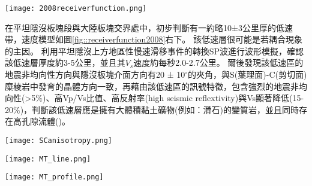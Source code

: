 \begin{figure*}[ht!]
    \centering
    \texttt{[image: 2008receiverfunction.png]}
    \caption{墨西哥平坦隱沒區域接收函數結果，摘自\citealp{PerezCampos2008}。上圖：黑色三角形表示測站沿剖面的位置，高程被放大10倍。粗棕色線表示跨墨西哥火山帶(TMVB, Trans-Mexican Volcanic Belt)的範圍。上圖接收函數影像中標出沿剖面50公里範圍內的震源(粉紅色點來自SSN地震目錄；綠色點來自\citealp{pardo1995}重新定位結果)位置。下方左圖：顯示沿平坦隱沒板塊的一次遠震事件的接收函數。下方中間圖:說明了相應的模型（LVM(low velocity mantle) = 低速地函和 OC(oceanic crust) = 海洋地殼）。下方右圖：根據左下圖接收函數模型中A、B和C位置上的P波速度模型。
    }
    \label{fig::receiverfunction2008}
\end{figure*}

\citealp{PerezCampos2008}在平坦隱沒板塊段與大陸板塊交界處中，初步判斷有一約略10±3公里厚的低速帶，速度模型如圖\ref{fig::receiverfunction2008}右下。
該低速層很可能是若耦合現象的主因。
\citealp{Song2009}利用平坦隱沒上方地區性慢速滑移事件的轉換SP波進行波形模擬，確認該低速層厚度約3-5公里，並且其$V_s$速度約每秒2.0-2.7公里。
爾後\citealp{Song2012SC}發現該低速區的地震非均向性方向與隱沒板塊介面方向有20 ± 10$^{\circ}$的夾角，與S(葉理面)-C(剪切面)糜棱岩中發育的晶體方向一致，再藉由該低速區的訊號特徵，包含強烈的地震非均向性(>5$\%$)、高Vp/Vs比值、高反射率(high seismic reflextivity)與Vs顯著降低(15-20$\%$)，判斷該低速層應是擁有大體積黏土礦物(例如：滑石)的變質岩，並且同時存在高孔隙流體(\citealp{Kim2012})。

\begin{figure*}[ht!]
    \centering
    \texttt{[image: SCanisotropy.png]}
    \caption{墨西哥隱沒帶板塊介面附近剪切帶結構示意圖(\citealp{Song2012SC}
    )。大地震主要發生在鎖定區(locked zone)和脆性(brittle)變形區域。慢速滑移事件(slow-slip event)主要發生在過渡帶(transition zone)和半韌性區域(seni-ductile regime)，Vs非常低，且非均向性極強。岩石流變轉換由350$^{\circ}$等溫線(淺藍色線)分開，導致應力梯度形成且方向與黏土礦物中流體壓力相反，導致低速帶的形成。這些低速帶流體導致板塊介面處於低耦合狀態，並且主導該地區慢速滑移事件的生成。
    }
    \label{fig::SCanisotorpy2012}
\end{figure*}

\begin{figure*}[ht!]
    \centering
    \texttt{[image: MT\_line.png]}
    \caption{\citealp{MT2006}中所使用的大地電磁剖面位置圖，本研究僅使用BB'剖面。
    }
    \label{fig::MT_site}
\end{figure*}

\begin{figure*}[ht!]
    \centering
    \texttt{[image: MT\_profile.png]}
    \caption{墨西哥平坦隱沒區域的導電率異常剖面圖與解釋圖，摘自\citealp{MT2006}。上圖為電阻率異常結果剖面，所繪之隱沒板塊位置參考自\citealp{pardo1995}結果，最上方標示跨墨西哥火山帶的範圍。圖中每個數字圈皆代表隱沒帶上岩石發生向變後脫水的位置。下圖為電阻異常解釋圖，綠色區域為電阻異常低區(<100 $\Omega m$)。在平坦隱沒段結束處有多個岩石相變事件發生，隱沒板塊上出現大範圍導體。
    }
    \label{fig::MT_profile}
\end{figure*}

